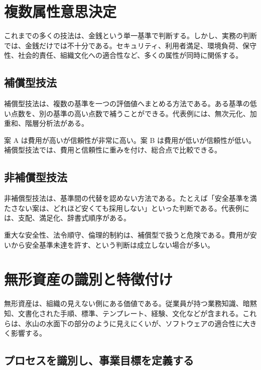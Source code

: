 \documentclass[a4paper,11pt]{article}
\begin{document}
\section{複数属性意思決定}

これまでの多くの技法は、金銭という単一基準で判断する。しかし、実務の判断では、金銭だけでは不十分である。セキュリティ、利用者満足、環境負荷、保守性、社会的責任、組織文化への適合性など、多くの属性が同時に関係する。

\subsection{補償型技法}

補償型技法は、複数の基準を一つの評価値へまとめる方法である。ある基準の低い点数を、別の基準の高い点数で補うことができる。代表例には、無次元化、加重和、階層分析法がある。

\begin{examplebox}
案 A は費用が高いが信頼性が非常に高い。案 B は費用が低いが信頼性が低い。補償型技法では、費用と信頼性に重みを付け、総合点で比較できる。
\end{examplebox}

\subsection{非補償型技法}

非補償型技法は、基準間の代替を認めない方法である。たとえば「安全基準を満たさない案は、どれほど安くても採用しない」といった判断である。代表例には、支配、満足化、辞書式順序がある。

\begin{termnote}
重大な安全性、法令順守、倫理的制約は、補償型で扱うと危険である。費用が安いから安全基準未達を許す、という判断は成立しない場合が多い。
\end{termnote}

\section{無形資産の識別と特徴付け}

無形資産は、組織の見えない側にある価値である。従業員が持つ業務知識、暗黙知、文書化された手順、標準、テンプレート、経験、文化などが含まれる。これらは、氷山の水面下の部分のように見えにくいが、ソフトウェアの適合性に大きく影響する。

\subsection{プロセスを識別し、事業目標を定義する}
\end{document}
